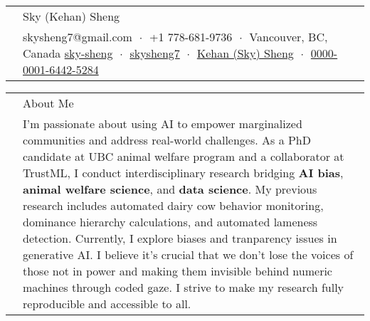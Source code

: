 \documentclass[letterpaper, 11pt]{article}
\newcommand{\socialicon}[1]{\raisebox{-0.05em}{\resizebox{!}{1em}{#1}}}
\newcommand{\headingfont}{\Large\color{OliveGreen}}
\newenvironment{SectionTable}[1]{
	\renewcommand*{\arraystretch}{1.7}
	\setlength{\tabcolsep}{10pt}
	\begin{longtable}{Rp{5.2in}} & #1 \\}
{\end{longtable}\vspace{-.3cm}}
\begin{document}

\begin{SectionTable}{\Huge Sky (Kehan) Sheng} & 
skysheng7@gmail.com  $\;\boldsymbol{\cdot}\;$ 
+1 778-681-9736 $\;\boldsymbol{\cdot}\;$ Vancouver, BC, Canada\newline
\socialicon{\faLinkedin} \href{www.linkedin.com/in/sky-sheng}{sky-sheng} $\;\boldsymbol{\cdot}\;$
\socialicon{\faGithub} \href{https://github.com/skysheng7}{skysheng7} $\;\boldsymbol{\cdot}\;$
\socialicon{\faGraduationCap} \href{https://scholar.google.com/citations?user=yz-cWVgAAAAJ}{Kehan (Sky) Sheng}
$\;\boldsymbol{\cdot}\;$ 
\socialicon{\faOrcid} \href{https://orcid.org/0000-0001-6442-5284}{0000-0001-6442-5284} 
\end{SectionTable}

\begin{SectionTable}{\headingfont About Me}
& I'm passionate about using AI to empower marginalized communities and address real-world challenges. As a PhD candidate at UBC animal welfare program and a collaborator at TrustML, I conduct interdisciplinary research bridging \textbf{AI bias}, \textbf{animal welfare science}, and \textbf{data science}. My previous research includes automated dairy cow behavior monitoring, dominance hierarchy calculations, and automated lameness detection. Currently, I explore biases and tranparency issues in generative AI. I believe it's crucial that we don't lose the voices of those not in power and making them invisible behind numeric machines through coded gaze. I strive to make my research fully reproducible and accessible to all.
\end{SectionTable}
\end{document}
